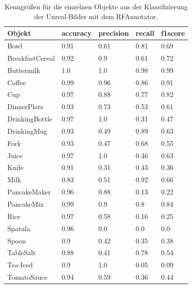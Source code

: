 \begin{table}
\begin{tabularx}{\textwidth}{Xllll}
\textbf{Objekt}	& \textbf{\gls{accuracy}} & \textbf{\gls{precision}}	& \textbf{\gls{recall}}	& \textbf{\gls{f1score}} \\ \hline
Bowl & 0.91 & 0.61 & 0.81 & 0.69 \\  
BreakfastCereal & 0.92 & 0.9 & 0.61 & 0.72 \\  
Buttermilk & 1.0 & 1.0 & 0.98 & 0.99 \\  
Coffee & 0.99 & 0.96 & 0.86 & 0.91 \\  
Cup & 0.97 & 0.88 & 0.77 & 0.82 \\  
DinnerPlate & 0.93 & 0.73 & 0.53 & 0.61 \\  
DrinkingBottle & 0.97 & 1.0 & 0.31 & 0.47 \\  
DrinkingMug & 0.93 & 0.49 & 0.89 & 0.63 \\  
Fork & 0.93 & 0.47 & 0.68 & 0.55 \\  
Juice & 0.97 & 1.0 & 0.46 & 0.63 \\  
Knife & 0.91 & 0.31 & 0.43 & 0.36 \\  
Milk & 0.83 & 0.51 & 0.92 & 0.66 \\  
PancakeMaker & 0.96 & 0.88 & 0.13 & 0.22 \\  
PancakeMix & 0.99 & 0.9 & 0.8 & 0.84 \\  
Rice & 0.97 & 0.58 & 0.16 & 0.25 \\  
Spatula & 0.96 & 0.0 & 0.0 & 0.0 \\  
Spoon & 0.9 & 0.42 & 0.35 & 0.38 \\  
TableSalt & 0.88 & 0.41 & 0.78 & 0.54 \\  
Tea-Iced & 0.9 & 1.0 & 0.05 & 0.09 \\  
TomatoSauce & 0.94 & 0.59 & 0.36 & 0.44 \\  
\end{tabularx}
\caption[Objekt spezifische Kenngrößen des RFAnnotators]{Kenngrößen für die einzelnen Objekte aus der Klassifizierung der Unreal-Bilder mit dem RFAnnotator.}
\label{tab:classi_Ex_classMetrics}
\end{table}

